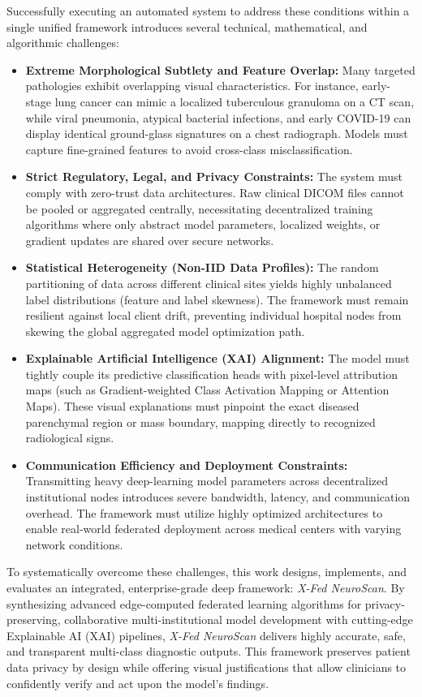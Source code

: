 Successfully executing an automated system to address these conditions within a single unified framework introduces several technical, mathematical, and algorithmic challenges:

\begin{itemize}
	\item \textbf{Extreme Morphological Subtlety and Feature Overlap:} Many targeted pathologies exhibit overlapping visual characteristics. For instance, early-stage lung cancer can mimic a localized tuberculous granuloma on a CT scan, while viral pneumonia, atypical bacterial infections, and early COVID-19 can display identical ground-glass signatures on a chest radiograph. Models must capture fine-grained features to avoid cross-class misclassification.
	\item \textbf{Strict Regulatory, Legal, and Privacy Constraints:} The system must comply with zero-trust data architectures. Raw clinical DICOM files cannot be pooled or aggregated centrally, necessitating decentralized training algorithms where only abstract model parameters, localized weights, or gradient updates are shared over secure networks.
	\item \textbf{Statistical Heterogeneity (Non-IID Data Profiles):} The random partitioning of data across different clinical sites yields highly unbalanced label distributions (feature and label skewness). The framework must remain resilient against local client drift, preventing individual hospital nodes from skewing the global aggregated model optimization path.
	\item \textbf{Explainable Artificial Intelligence (XAI) Alignment:} The model must tightly couple its predictive classification heads with pixel-level attribution maps (such as Gradient-weighted Class Activation Mapping or Attention Maps). These visual explanations must pinpoint the exact diseased parenchymal region or mass boundary, mapping directly to recognized radiological signs.
	\item \textbf{Communication Efficiency and Deployment Constraints:} Transmitting heavy deep-learning model parameters across decentralized institutional nodes introduces severe bandwidth, latency, and communication overhead. The framework must utilize highly optimized architectures to enable real-world federated deployment across medical centers with varying network conditions.
\end{itemize}

To systematically overcome these challenges, this work designs, implements, and evaluates an integrated, enterprise-grade deep framework: \textit{X-Fed NeuroScan}. By synthesizing advanced edge-computed federated learning algorithms for privacy-preserving, collaborative multi-institutional model development with cutting-edge Explainable AI (XAI) pipelines, \textit{X-Fed NeuroScan} delivers highly accurate, safe, and transparent multi-class diagnostic outputs. This framework preserves patient data privacy by design while offering visual justifications that allow clinicians to confidently verify and act upon the model's findings.

